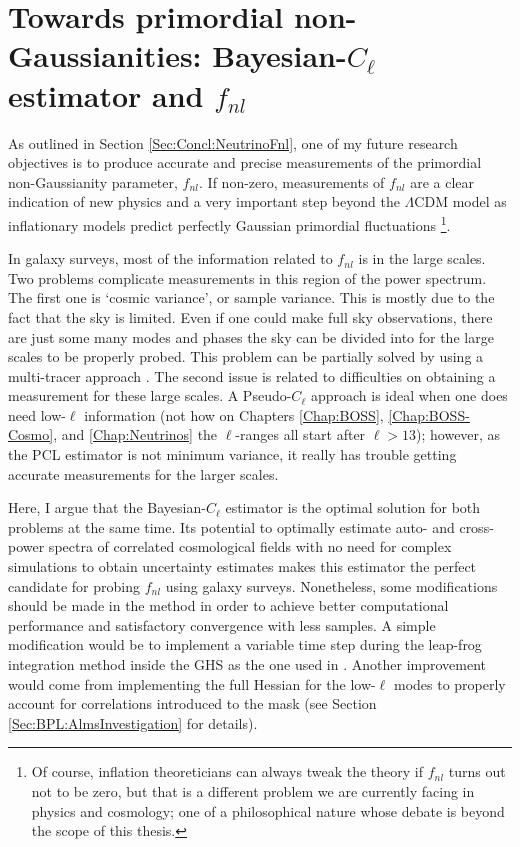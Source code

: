 \section{Towards primordial non-Gaussianities: Bayesian-$C_{\ell}$ estimator and $f_{nl}$}
As outlined in Section \ref{Sec:Concl:NeutrinoFnl}, one of my future research objectives is to produce accurate and precise measurements of the primordial non-Gaussianity parameter, $f_{nl}$. If non-zero, measurements of $f_{nl}$ are a clear indication of new physics and a very important step beyond the $\Lambda$CDM model as inflationary models predict perfectly Gaussian primordial fluctuations \footnote{Of course, inflation theoreticians can always tweak the theory if $f_{nl}$ turns out not to be zero, but that is a different problem we are currently facing in physics and cosmology; one of a philosophical nature whose debate is beyond the scope of this thesis.}.

\qquad In galaxy surveys, most of the information related to $f_{nl}$ is in the large scales. Two problems complicate measurements in this region of the power spectrum. The first one is `cosmic variance', or sample variance. This is mostly due to the fact that the sky is limited. Even if one could make full sky observations, there are just some many modes and phases the sky can be divided into for the large scales to be properly probed. This problem can be partially solved by using a multi-tracer approach \cite{2013AbramoLeonard,2016AbramoSeccoLoureiro}. The second issue is related to difficulties on obtaining a measurement for these large scales. A Pseudo-$C_{\ell}$ approach is ideal when one does need low-$\ell$ information (not how on Chapters \ref{Chap:BOSS}, \ref{Chap:BOSS-Cosmo}, and \ref{Chap:Neutrinos} the $\ell$-ranges all start after $\ell > 13$); however, as the PCL estimator is not minimum variance, it really has trouble getting accurate measurements for the larger scales. 

\qquad Here, I argue that the Bayesian-$C_{\ell}$ estimator is the optimal solution for both problems at the same time. Its potential to optimally estimate auto- and cross-power spectra of correlated cosmological fields with no need for complex simulations to obtain uncertainty estimates makes this estimator the perfect candidate for probing $f_{nl}$ using galaxy surveys. Nonetheless, some modifications should be made in the method in order to achieve better computational performance and satisfactory convergence with less samples. A simple modification would be to implement a variable time step during the leap-frog integration method inside the GHS as the one used in \cite{2013-LNHamiltonian}. Another improvement would come from implementing the full Hessian for the low-$\ell$ modes to properly account for correlations introduced to the mask (see Section \ref{Sec:BPL:AlmsInvestigation} for details).

